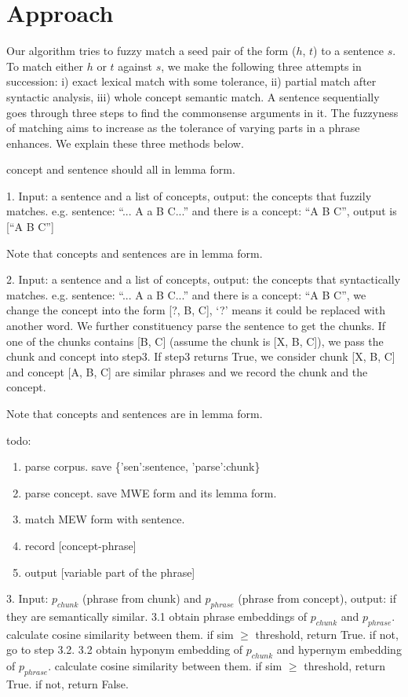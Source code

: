 \section{Approach}
\label{sec:approach}

Our algorithm tries to fuzzy match a seed pair of the form
($h$, $t$) to a sentence $s$. To match either $h$ or $t$ against $s$,
we make the following three attempts in succession: i) exact lexical 
match with some tolerance, ii) partial match after syntactic analysis,
iii) whole concept semantic match. A sentence sequentially goes through three steps to find the commonsense arguments in it. The fuzzyness of matching aims to increase as the tolerance of varying parts in a phrase enhances. We explain these three methods below.

concept and sentence should all in lemma form.

1. Input: a sentence and a list of concepts, output: the concepts that fuzzily matches. e.g. sentence: ``... A a B C...'' and there is a concept: ``A B C'', output is [``A B C'']

Note that concepts and sentences are in lemma form.


2. Input: a sentence and a list of concepts, output: the concepts that syntactically  matches. e.g. sentence: ``... A a B C...'' and there is a concept: ``A B C'', we change the concept into the form [?, B, C], `?' means it could be replaced with another word. We further constituency parse the sentence to get the chunks. If one of the chunks contains [B, C] (assume the chunk is [X, B, C]), we pass the chunk and concept into step3. If step3 returns True, we consider chunk [X, B, C] and concept [A, B, C] are similar phrases and we record the chunk and the concept.

Note that concepts and sentences are in lemma form.

todo:
\begin{enumerate}

\item  parse corpus. save \{'sen':sentence, 'parse':chunk\}
\item  parse concept. save MWE form and its lemma form.
\item  match MEW form with sentence.
\item  record [concept-phrase]
\item  output [variable part of the phrase]
\end{enumerate}


3. Input: $p_{chunk}$ (phrase from chunk) and $p_{phrase}$ (phrase from concept), output: if they are semantically similar.
3.1 obtain phrase embeddings of $p_{chunk}$ and $p_{phrase}$. calculate cosine similarity between them. if sim $\geq$ threshold, return True. if not, go to step 3.2.
3.2 obtain hyponym embedding of $p_{chunk}$ and hypernym embedding of $p_{phrase}$. calculate cosine similarity between them. if sim $\geq$ threshold, return True. if not, return False.

